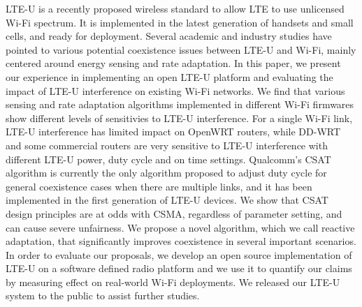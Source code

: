 LTE-U is a recently proposed wireless standard to
allow LTE to use unlicensed Wi-Fi spectrum. It is implemented
in the latest generation of handsets and small cells, and ready for
deployment. Several academic and industry studies have pointed
to various potential coexistence issues between LTE-U and Wi-Fi,
mainly centered around energy sensing and rate adaptation. 
In this paper, we present our experience in implementing 
an open LTE-U platform and evaluating the impact 
of LTE-U interference on existing Wi-Fi networks.
We find that various sensing and rate adaptation algorithms
implemented in different Wi-Fi firmwares show 
different levels of sensitivies to LTE-U interference. 
For a single Wi-Fi link, 
LTE-U interference has limited impact on OpenWRT routers, while
DD-WRT and some commercial routers are very sensitive to 
LTE-U interference with different LTE-U power, duty cycle and on time settings. 
Qualcomm’s CSAT algorithm is currently
the only algorithm proposed to adjust duty cycle for general
coexistence cases when there are multiple links, and it has been
implemented in the first generation of LTE-U devices. We show
that CSAT design principles are at odds with CSMA, regardless
of parameter setting, and can cause severe unfairness. We
propose a novel algorithm, which we call reactive adaptation, that
significantly improves coexistence in several important scenarios.
In order to evaluate our
proposals, we develop an open source implementation of LTE-U
on a software defined radio platform and we use it to quantify our
claims by measuring effect on real-world Wi-Fi deployments. We
released our LTE-U system to the public to assist further studies.






